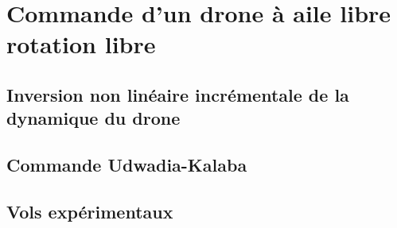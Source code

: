 \chapter{Commande d'un drone à aile libre rotation libre}
\minitoc

\section{Inversion non linéaire incrémentale de la dynamique du drone}

\section{Commande Udwadia-Kalaba}

\section{Vols expérimentaux}






